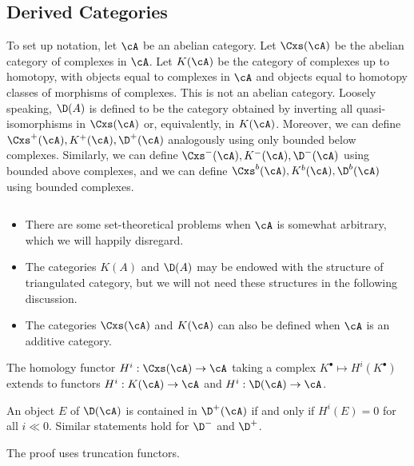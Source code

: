 \subsection{Derived Categories}

To set up notation, let $\cA$ be an abelian category. Let $\Cxs(\cA)$ be the abelian category of complexes in $\cA$.  Let $K(\cA)$ be the category of complexes up to homotopy, with objects equal to complexes in $\cA$ and objects equal to homotopy classes of morphisms of complexes. This is not an abelian category. Loosely speaking, $\D(A)$ is defined to be the category obtained by inverting all quasi-isomorphisms in $\Cxs(\cA)$ or, equivalently, in $K(\cA)$.  Moreover, we can define $\Cxs^+(\cA), K^+(\cA), \D^+(\cA)$ analogously using only bounded below complexes.  Similarly, we can define $\Cxs^-(\cA), K^-(\cA), \D^-(\cA)$ using bounded above complexes, and we can define $\Cxs^b(\cA), K^b(\cA), \D^b(\cA)$ using bounded complexes.

\begin{remark} $ $
\begin{itemize}
\item
There are some set-theoretical problems when $\cA$ is somewhat arbitrary, which we will happily disregard.
\item
The categories $K(A)$ and $\D(A)$ may be endowed with the structure of triangulated category, but we will not need these structures in the following discussion. 
\item
The categories $\Cxs(\cA)$ and $K(\cA)$ can also be defined when $\cA$ is an additive category.
\end{itemize}
\end{remark}

The homology functor $H^i: \Cxs(\cA) \to \cA$ taking a complex $K^\bullet \mapsto H^i(K^\bullet)$ extends to functors $H^i: K(\cA) \to \cA$ and $H^i: \D(\cA) \to \cA$.

\begin{lem}
An object $E$ of $\D(\cA)$ is contained in $\D^+(\cA)$ if and only if $H^i(E) =0 $ for all $i \ll 0$.  Similar statements hold for $\D^-$ and $\D^+$.
\end{lem}

The proof uses truncation functors.

